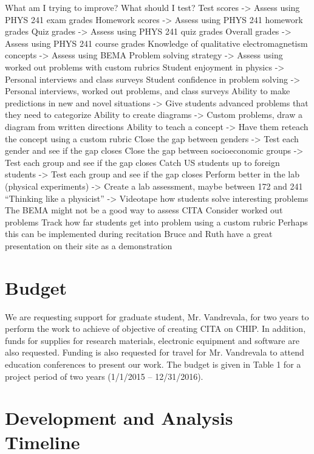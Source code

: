What am I trying to improve? What should I test?
Test scores -> Assess using PHYS 241 exam grades
Homework scores -> Assess using PHYS 241 homework grades
Quiz grades -> Assess using PHYS 241 quiz grades
Overall grades -> Assess using PHYS 241 course grades
Knowledge of qualitative electromagnetism concepts -> Assess using BEMA
Problem solving strategy -> Assess using worked out problems with custom rubrics
Student enjoyment in physics -> Personal interviews and class surveys
Student confidence in problem solving -> Personal interviews, worked out problems, and class surveys
Ability to make predictions in new and novel situations -> Give students advanced problems that they need to categorize
Ability to create diagrams -> Custom problems, draw a diagram from written directions
Ability to teach a concept -> Have them reteach the concept using a custom rubric
Close the gap between genders -> Test each gender and see if the gap closes
Close the gap between socioeconomic groups -> Test each group and see if the gap closes
Catch US students up to foreign students -> Test each group and see if the gap closes
Perform better in the lab (physical experiments) -> Create a lab assessment, maybe between 172 and 241
“Thinking like a physicist” -> Videotape how students solve interesting problems
The BEMA might not be a good way to assess CITA
Consider worked out problems
Track how far students get into problem using a custom rubric
Perhaps this can be implemented during recitation
Bruce and Ruth have a great presentation on their site as a demonstration

\section{Budget}

We are requesting support for graduate student, Mr. Vandrevala, for two years to perform the
work to achieve of objective of creating CITA on CHIP. In addition, funds for supplies for
research materials, electronic equipment and software are also requested. Funding is also
requested for travel for Mr. Vandrevala to attend education conferences to present our work.
The budget is given in Table 1 for a project period of two years (1/1/2015 – 12/31/2016).

\section{Development and Analysis Timeline}

